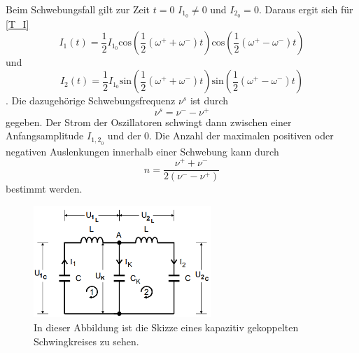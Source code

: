 Beim Schwebungsfall gilt zur Zeit $t = 0$ $I_{1_0}\neq 0$ und $I_{2_0} = 0$. Daraus ergit sich für \autoref{T_I} 
\begin{equation*}
    I_1(t) = \frac{1}{2} I_{1_0}\text{cos}\left(\frac{1}{2}(\omega^+ + \omega^-)t\right) \text{cos}\left(\frac{1}{2}(\omega^+ - \omega^-)t\right)
\end{equation*}
und
\begin{equation*}
    I_2(t) = \frac{1}{2} I_{1_0}\text{sin}\left(\frac{1}{2}(\omega^+ + \omega^-)t\right) \text{sin}\left(\frac{1}{2}(\omega^+ - \omega^-)t\right)
\end{equation*}
.
Die dazugehörige Schwebungsfrequenz $\nu^s$ ist durch 
\begin{equation}
    \label{T_Schwebung}
    \nu^s = \nu^- -\nu^+
\end{equation}
gegeben. Der Strom der Oszillatoren schwingt dann zwischen einer Anfangsamplitude $I_{{1,2}_0}$ und der $0$.
Die Anzahl der maximalen positiven oder negativen Auslenkungen innerhalb einer Schwebung kann durch
\begin{equation}
    \label{T_n}
    n = \frac{\nu^+ + \nu^-}{2\left(\nu^- - \nu^+\right)} 
\end{equation}
bestimmt werden.  
\begin{figure}
    \centering
    \caption{In dieser Abbildung ist die Skizze eines kapazitiv gekoppelten Schwingkreises zu sehen. \cite{v355}}
    \label{fig:T_skgS}
    \includegraphics[width = 0.6\textwidth]{content/SkizzegekoppelterSchwingkreis.PNG}
\end{figure}
